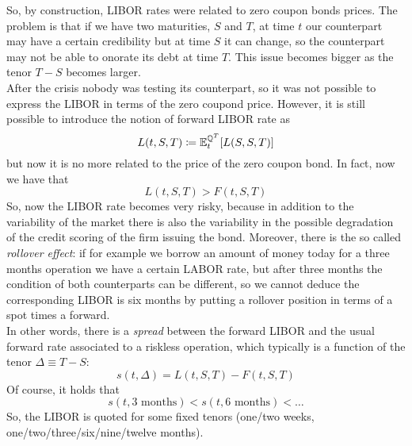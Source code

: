 So, by construction, LIBOR rates were related to zero coupon bonds prices. The problem is that if we have two maturities, $S$ and $T$, at time $t$ our counterpart may have a certain credibility but at time $S$ it can change, so the counterpart may not be able to onorate its debt at time $T$. This issue becomes bigger as the tenor $T-S$ becomes larger. \\
After the crisis nobody was testing its counterpart, so it was not possible to express the LIBOR in terms of the zero coupond price. However, it is still possible to introduce the notion of forward LIBOR rate as
\begin{equation*}
    L(t,S,T) \coloneqq \mathbb{E}^{\mathbb{Q}^T}_t[L(S,S,T)]
\end{equation*}
but now it is no more related to the price of the zero coupon bond. In fact, now we have that
\begin{equation*}
    L(t,S,T) > F(t,S,T)
\end{equation*} %
So, now the LIBOR rate becomes very risky, because in addition to the variability of the market there is also the variability in the possible degradation of the credit scoring of the firm issuing the bond. Moreover, there is the so called \emph{rollover effect}: if for example we borrow an amount of money today for a three months operation we have a certain LABOR rate, but after three months the condition of both counterparts can be different, so we cannot deduce the corresponding LIBOR is six months by putting a rollover position in terms of a spot times a forward. \\ %
In other words, there is a \emph{spread} between the forward LIBOR and the usual forward rate associated to a riskless operation, which typically is a function of the tenor $\Delta\equiv T-S$:
\begin{equation}
    s(t,\Delta) = L(t,S,T) - F(t,S,T)
\end{equation}
Of course, it holds that
\begin{equation*}
    s(t, \text{3 months}) < s(t, \text{6 months}) < \dots
\end{equation*}
So, the LIBOR is quoted for some fixed tenors (one/two weeks, one/two/three/six/nine/twelve months). \\
